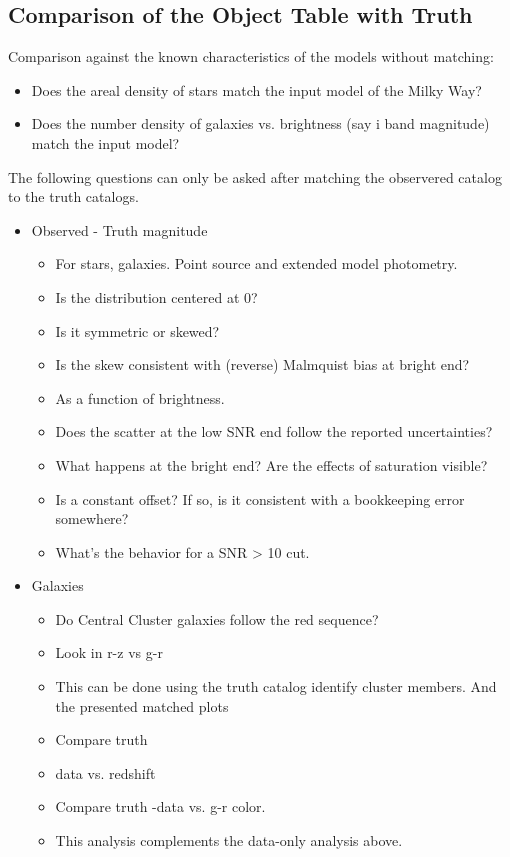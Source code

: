 \documentclass[11pt]{report}
\begin{document}
\subsection{Comparison of the Object Table with Truth}

Comparison against the known characteristics of the models without matching:

\begin{itemize}
  \item Does the areal density of stars match the input model of the Milky Way?
  \item Does the number density of galaxies vs. brightness (say i band magnitude) match the input model?
\end{itemize}

The following questions can only be asked after matching the observered catalog to the truth catalogs.

\begin{itemize}
  \item Observed - Truth magnitude
  \begin{itemize}
      \item For stars, galaxies.  Point source and extended model photometry.
      \item Is the distribution centered at 0?
      \item Is it symmetric or skewed?
      \item Is the skew consistent with (reverse) Malmquist bias at bright end?
      \item As a function of brightness.
        \item Does the scatter at the low SNR end follow the reported uncertainties?
        \item What happens at the bright end? Are the effects of saturation visible?
      \item Is a constant offset?  If so, is it consistent with a bookkeeping error somewhere?
      \item What's the behavior for a SNR > 10 cut.
  \end{itemize}

  \item Galaxies
  \begin{itemize}
      \item Do Central Cluster galaxies follow the red sequence?
        \item Look in r-z vs g-r
        \item This can be done using the truth catalog identify cluster members.  And the presented matched plots
        \item Compare truth 
        \item data vs. redshift
        \item Compare truth -data vs. g-r color.
        \item This analysis complements the data-only analysis above.
    \end{itemize}
\end{itemize}
\end{document}
